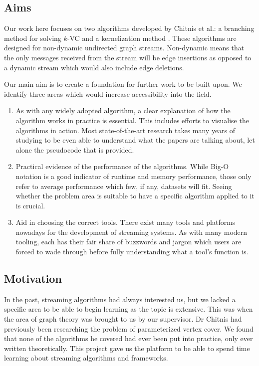\subsection{Aims}

Our work here focuses on two algorithms developed by Chitnis et al.: a
branching method for solving \(k\)-VC \cite{chitnis2019towards} and a
kernelization method \cite{chitnis2015parameterized}. These algorithms are
designed for non-dynamic undirected graph streams. Non-dynamic means that the
only messages received from the stream will be edge insertions as opposed to a
dynamic stream which would also include edge deletions.

Our main aim is to create a foundation for further work to be built upon. We
identify three areas which would increase accessibility into the field.

\begin{enumerate}
    \item
          As with any widely adopted algorithm, a clear explanation of how the
          algorithm works in practice is essential. This includes efforts to
          visualise the algorithms in action. Most state-of-the-art research
          takes many years of studying to be even able to understand what the
          papers are talking about, let alone the pseudocode that is provided.
    \item
          Practical evidence of the performance of the algorithms. While Big-O
          notation is a good indicator of runtime and memory performance, those
          only refer to average performance which few, if any, datasets will
          fit. Seeing whether the problem area is suitable to have a specific
          algorithm applied to it is crucial.
    \item
          Aid in choosing the correct tools. There exist many tools and
          platforms nowadays for the development of streaming systems. As with
          many modern tooling, each has their fair share of buzzwords and
          jargon which users are forced to wade through before fully understanding
          what a tool's function is.
\end{enumerate}

\subsection{Motivation}

In the past, streaming algorithms had always interested us, but we lacked a
specific area to be able to begin learning as the topic is extensive. This was
when the area of graph theory was brought to us by our supervisor. Dr Chitnis
had previously been researching the problem of parameterized vertex cover. We
found that none of the algorithms he covered had ever been put into practice,
only ever written theoretically. This project gave us the platform to be able
to spend time learning about streaming algorithms and frameworks.
